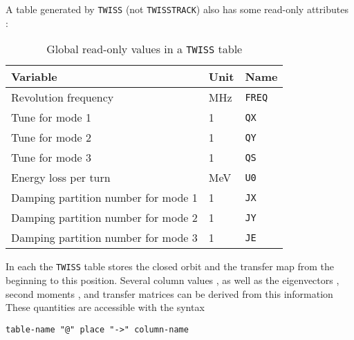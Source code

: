 A table generated by \texttt{TWISS} (not \texttt{TWISSTRACK})
also has some read-only attributes :
\begin{table}[Ht] \footnotesize
  \begin{center}
    \caption{Global read-only values in a \texttt{TWISS} table}
    \label{tab:twiss-glob}
    \begin{tabular}{|l|l|l|}
      \hline
      Variable & Unit & Name \\
      \hline
      Revolution frequency & MHz & \texttt{FREQ}\index{FREQ} \\
      Tune for mode 1 & 1 & \texttt{QX}\index{QX} \\
      Tune for mode 2 & 1 & \texttt{QY}\index{QY} \\
      Tune for mode 3 & 1 & \texttt{QS}\index{QS} \\
      Energy loss per turn & MeV & \texttt{U0}\index{U0} \\
      Damping partition number for mode 1 & 1 & \texttt{JX}\index{JX} \\
      Damping partition number for mode 2 & 1 & \texttt{JY}\index{JY} \\
      Damping partition number for mode 3 & 1 & \texttt{JE}\index{JE} \\
      \hline
    \end{tabular}
  \end{center}
\end{table}

In each the \texttt{TWISS} table stores the closed orbit and the
transfer map from the beginning to this position.
Several column values ,
as well as the eigenvectors ,
second moments ,
and transfer matrices  can be derived from this
information
These quantities are accessible with the syntax 
\begin{verbatim}
table-name "@" place "->" column-name
\end{verbatim}

